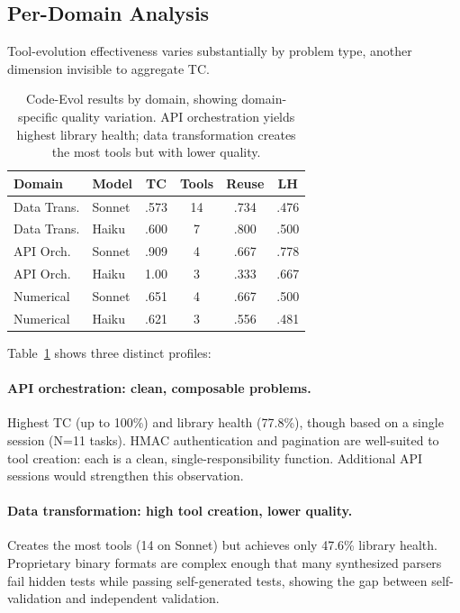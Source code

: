 \documentclass[sigconf,anonymous,review,natbib=false]{acmart}
\begin{document}
\subsection{Per-Domain Analysis}
\label{sec:domain_analysis}

Tool-evolution effectiveness varies substantially by problem type, another dimension invisible to aggregate TC.

\begin{table}[t]
\centering
\footnotesize
\begin{tabular}{llcccc}
\toprule
\textbf{Domain} & \textbf{Model} & \textbf{TC} & \textbf{Tools} & \textbf{Reuse} & \textbf{LH} \\
\midrule
Data Trans. & Sonnet & .573 & 14 & .734 & .476 \\
Data Trans. & Haiku & .600 & 7 & .800 & .500 \\
\midrule
API Orch. & Sonnet & .909 & 4 & .667 & .778 \\
API Orch. & Haiku & 1.00 & 3 & .333 & .667 \\
\midrule
Numerical & Sonnet & .651 & 4 & .667 & .500 \\
Numerical & Haiku & .621 & 3 & .556 & .481 \\
\bottomrule
\end{tabular}
\caption{Code-Evol results by domain, showing domain-specific quality variation. API orchestration yields highest library health; data transformation creates the most tools but with lower quality.}
\label{tab:domain}
\end{table}

Table~\ref{tab:domain} shows three distinct profiles:

\paragraph{API orchestration: clean, composable problems.} Highest TC (up to 100\%) and library health (77.8\%), though based on a single session (N=11 tasks). HMAC authentication and pagination are well-suited to tool creation: each is a clean, single-responsibility function. Additional API sessions would strengthen this observation.

\paragraph{Data transformation: high tool creation, lower quality.} Creates the most tools (14 on Sonnet) but achieves only 47.6\% library health. Proprietary binary formats are complex enough that many synthesized parsers fail hidden tests while passing self-generated tests, showing the gap between self-validation and independent validation.
\end{document}
